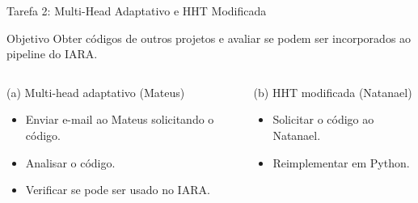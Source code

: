 \documentclass[aspectratio=169]{beamer}
\begin{document}
\begin{frame}{Tarefa 2: Multi-Head Adaptativo e HHT Modificada}
    \footnotesize
    \begin{block}{\small Objetivo}
        \scriptsize
        Obter códigos de outros projetos e avaliar se podem ser incorporados ao pipeline do IARA.
    \end{block}

    \vspace{0.05cm}
    \begin{columns}[t]
        \begin{block}{\small (a) Multi-head adaptativo (Mateus)}
            \scriptsize
            \begin{itemize}
                \setlength{\itemsep}{1pt}
                \item Enviar e-mail ao Mateus solicitando o código.
                \item Analisar o código.
                \item Verificar se pode ser usado no IARA.
            \end{itemize}
        \end{block}

        \begin{block}{\small (b) HHT modificada (Natanael)}
            \scriptsize
            \begin{itemize}
                \setlength{\itemsep}{1pt}
                \item Solicitar o código ao Natanael.
                \item Reimplementar em Python.
            \end{itemize}
        \end{block}
    \end{columns}
\end{frame}
\end{document}
